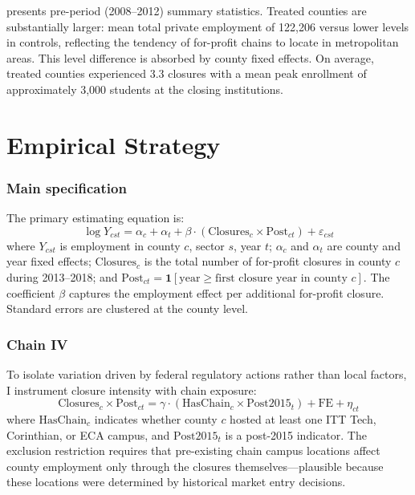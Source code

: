 \documentclass[12pt]{article}
\begin{document}
 presents pre-period (2008--2012) summary statistics. Treated counties are substantially larger: mean total private employment of 122,206 versus lower levels in controls, reflecting the tendency of for-profit chains to locate in metropolitan areas. This level difference is absorbed by county fixed effects. On average, treated counties experienced 3.3 closures with a mean peak enrollment of approximately 3,000 students at the closing institutions.

\section{Empirical Strategy}

\subsubsection*{Main specification} The primary estimating equation is:
\begin{equation}
\log Y_{cst} = \alpha_c + \alpha_t + \beta \cdot (\text{Closures}_c \times \text{Post}_{ct}) + \varepsilon_{cst}
\label{eq:main}
\end{equation}
where $Y_{cst}$ is employment in county $c$, sector $s$, year $t$; $\alpha_c$ and $\alpha_t$ are county and year fixed effects; $\text{Closures}_c$ is the total number of for-profit closures in county $c$ during 2013--2018; and $\text{Post}_{ct} = \mathbf{1}[\text{year} \geq \text{first closure year in county } c]$. The coefficient $\beta$ captures the employment effect per additional for-profit closure. Standard errors are clustered at the county level.

\subsubsection*{Chain IV} To isolate variation driven by federal regulatory actions rather than local factors, I instrument closure intensity with chain exposure:
\begin{equation}
\text{Closures}_c \times \text{Post}_{ct} = \gamma \cdot (\text{HasChain}_c \times \text{Post2015}_t) + \text{FE} + \eta_{ct}
\end{equation}
where $\text{HasChain}_c$ indicates whether county $c$ hosted at least one ITT Tech, Corinthian, or ECA campus, and $\text{Post2015}_t$ is a post-2015 indicator. The exclusion restriction requires that pre-existing chain campus locations affect county employment only through the closures themselves---plausible because these locations were determined by historical market entry decisions.
\end{document}
